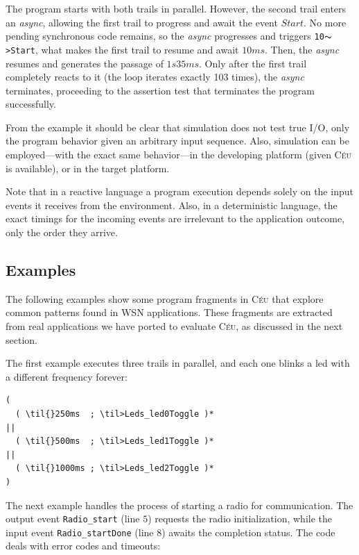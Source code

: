 \documentclass{sig-alternate-ipsn09}
\newcommand{\2}{\;\;}
\newcommand{\5}{\;\;\;\;\;}
\newcommand{\til}{$\thicksim$}
\newcommand{\CEU}{\textsc{C\'{e}u}}
\newcommand{\code}[1] {{\small{\texttt{#1}}}}
\begin{document}
The program starts with both trails in parallel.
However, the second trail enters an \emph{async}, allowing the first trail to 
progress and await the event $Start$.
No more pending synchronous code remains, so the \emph{async} progresses and 
triggers \code{10\til>Start}, what makes the first trail to resume and await 
$10ms$.
Then, the \emph{async} resumes and generates the passage of $1s35ms$.
Only after the first trail completely reacts to it (the loop iterates exactly 
103 times), the \emph{async} terminates, proceeding to the assertion test that 
terminates the program successfully.

From the example it should be clear that simulation does not test true I/O, 
only the program behavior given an arbitrary input sequence.
Also, simulation can be employed---with the exact same behavior---in the 
developing platform (given \CEU{} is available), or in the target platform.

Note that in a reactive language a program execution depends solely on the 
input events it receives from the environment.
Also, in a deterministic language, the exact timings for the incoming events 
are irrelevant to the application outcome, only the order they arrive.

\subsection{Examples}
\label{sec:ceu:examples}

The following examples show some program fragments in \CEU{} that explore 
common patterns found in WSN applications.
These fragments are extracted from real applications we have ported to evaluate 
\CEU, as discussed in the next section.

The first example executes three trails in parallel, and each one blinks a led 
with a different frequency forever:
\newline
\newline
\newline

\begin{Verbatim}[commandchars=\\\{\}]
(
  ( \til{}250ms  ; \til>Leds_led0Toggle )*
||
  ( \til{}500ms  ; \til>Leds_led1Toggle )*
||
  ( \til{}1000ms ; \til>Leds_led2Toggle )*
)
\end{Verbatim}

The next example handles the process of starting a radio for communication.
The output event \code{Radio\_start} (line $5$) requests the radio 
initialization, while the input event \code{Radio\_startDone} (line $8$) awaits 
the completion status.
The code deals with error codes and timeouts:
\end{document}
